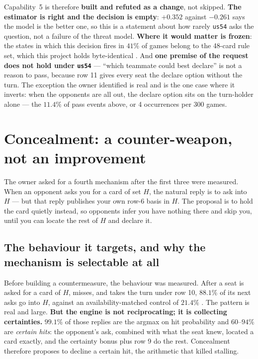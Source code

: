 \documentclass[11pt]{article}
\newcommand{\code}[1]{\texttt{#1}}
\newcommand{\usff}{\code{us54}}
\begin{document}
Capability~5 is therefore \textbf{built and refuted as a change}, not skipped. \textbf{The estimator
is right and the decision is empty}: $+0.352$ against $-0.261$ says the model is the better one, so
this is a statement about how rarely \usff{} asks the question, not a failure of the threat model.
\textbf{Where it would matter is frozen}: the states in which this decision fires in $41\%$ of games
belong to the 48-card rule set, which this project holds byte-identical \cite{styles}. And
\textbf{one premise of the request does not hold under \usff{}} --- ``which teammate could best
declare'' is not a reason to pass, because row 11 gives every seat the declare option without the
turn. The exception the owner identified is real and is the one case where it inverts: when the
opponents are all out, the declare option sits on the turn-holder alone --- the $11.4\%$ of pass
events above, or 4 occurrences per 300 games.

\section{Concealment: a counter-weapon, not an improvement}
\label{sec:conceal}

The owner asked for a fourth mechanism after the first three were measured. When an opponent asks
you for a card of set $H$, the natural reply is to ask into $H$ --- but that reply publishes your
own row-6 basis in $H$. The proposal is to hold the card quietly instead, so opponents infer you
have nothing there and skip you, until you can locate the rest of $H$ and declare it.

\subsection{The behaviour it targets, and why the mechanism is selectable at all}
\label{sec:arbitrate}

Before building a countermeasure, the behaviour was measured. After a seat is asked for a card of
$H$, misses, and takes the turn under row 10, $\mathbf{88.1\%}$ of its next asks go into $H$,
against an availability-matched control of $\mathbf{21.4\%}$ \cite{asking}. The pattern is real and
large. \textbf{But the engine is not reciprocating; it is collecting certainties.} $99.1\%$ of those
replies are the argmax on hit probability and $60$--$94\%$ are \emph{certain hits}: the opponent's
ask, combined with what the seat knew, located a card exactly, and the certainty bonus plus row 9 do
the rest. Concealment therefore proposes to decline a certain hit, the arithmetic that killed
stalling.
\end{document}
